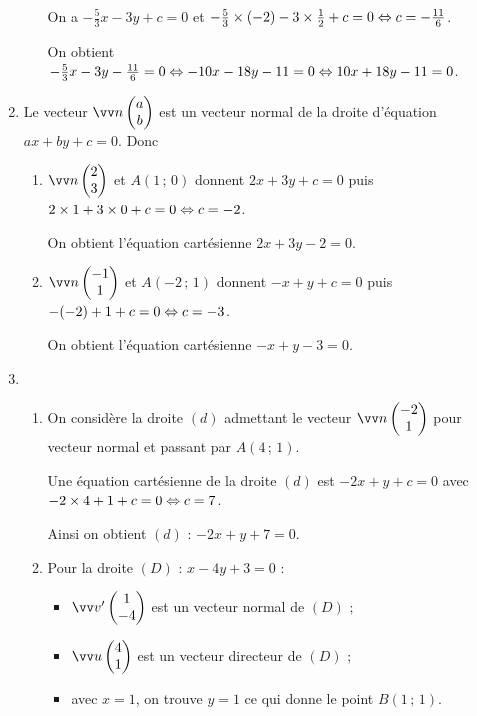 \documentclass[a4paper,11pt]{article}
\begin{document}
\begin{enumerate}
\begin{enumerate}
		On a $-\tfrac53 x-3y+c=0$ et $-\tfrac53 \times (-2)-3\times\tfrac12+c=0 \Leftrightarrow c=-\tfrac{11}{6}$.
		
		On obtient $-\tfrac53 x-3y-\tfrac{11}{6}=0 \Leftrightarrow -10x-18y-11=0 \Leftrightarrow 10x+18y-11=0$.
	\end{enumerate}
	\item Le vecteur $\vect{n} \begin{pmatrix} a\\b \end{pmatrix}$ est un vecteur normal de la droite d'équation $ax+by+c=0$. Donc 
	\begin{enumerate}
		\item $\vect{n} \begin{pmatrix}2\\3\end{pmatrix}$ et $A(1\,;\,0)$ donnent $2x+3y+c=0$ puis $2\times1+3\times0+c=0 \Leftrightarrow c=-2$.
		
		On obtient l'équation cartésienne $2x+3y-2=0$.
		\item $\vect{n} \begin{pmatrix}-1\\1\end{pmatrix}$ et $A(-2\,;\,1)$ donnent $-x+y+c=0$ puis $-(-2)+1+c=0 \Leftrightarrow c=-3$.
		
		On obtient l'équation cartésienne $-x+y-3=0$.
	\end{enumerate}
	\item 
	\begin{enumerate}
		\item On considère la droite $(d)$ admettant le vecteur $\vect{n} \begin{pmatrix}-2\\1\end{pmatrix}$ pour vecteur normal et passant par  $A(4\,;\,1)$.
		
		Une équation cartésienne de la droite $(d)$ est $-2x+y+c=0$ avec $-2\times4+1+c=0 \Leftrightarrow c=7$.
		
		Ainsi on obtient $(d)$ : $-2x+y+7=0$.
		\item Pour la droite $(D)$ : $x - 4y + 3 = 0$ :
		
		\begin{itemize}
			\item $\vect{v'} \begin{pmatrix} 1\\-4 \end{pmatrix}$ est un vecteur normal de $(D)$ ;
			\item $\vect{u} \begin{pmatrix} 4\\1 \end{pmatrix}$ est un vecteur directeur de $(D)$ ;
			\item avec $x=1$, on trouve $y=1$ ce qui donne le point $B(1\,;\,1)$.
		\end{itemize}
	\end{enumerate}
\end{enumerate}
\end{document}
